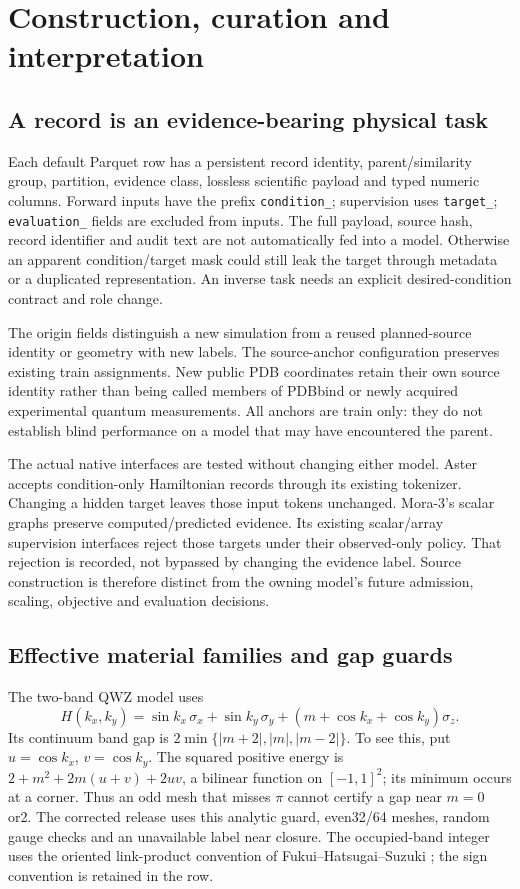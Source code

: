 \section{Construction, curation and interpretation}
\subsection{A record is an evidence-bearing physical task}
Each default Parquet row has a persistent record identity, parent/similarity
group, partition, evidence class, lossless scientific payload and typed numeric
columns. Forward inputs have the prefix \texttt{condition\_}; supervision uses
\texttt{target\_}; \texttt{evaluation\_} fields are excluded from inputs.
The full payload, source hash, record identifier and audit text are not
automatically fed into a model. Otherwise an apparent condition/target mask
could still leak the target through metadata or a duplicated representation.
An inverse task needs an explicit desired-condition contract and role change.

The origin fields distinguish a new simulation from a reused planned-source
identity or geometry with new labels. The source-anchor configuration preserves
existing train assignments. New public PDB coordinates retain their own source
identity rather than being called members of PDBbind or newly acquired
experimental quantum measurements. All anchors are train only: they do not
establish blind performance on a model that may have encountered the parent.

The actual native interfaces are tested without changing either model.
Aster accepts condition-only Hamiltonian records through its existing tokenizer.
Changing a hidden target leaves those input tokens unchanged. Mora-3's scalar
graphs preserve computed/predicted evidence. Its existing scalar/array
supervision interfaces reject those targets under their observed-only policy.
That rejection is recorded, not bypassed by changing the evidence label.
Source construction is therefore distinct from the owning model's future
admission, scaling, objective and evaluation decisions.

\subsection{Effective material families and gap guards}
The two-band QWZ model uses
\[
 H(k_x,k_y)=\sin k_x\,\sigma_x+\sin k_y\,\sigma_y
 +(m+\cos k_x+\cos k_y)\sigma_z.
\]
Its continuum band gap is
$2\min\{|m+2|,|m|,|m-2|\}$. To see this, put
$u=\cos k_x$, $v=\cos k_y$. The squared positive energy is
$2+m^2+2m(u+v)+2uv$, a bilinear function on $[-1,1]^2$;
its minimum occurs at a corner. Thus an odd mesh that misses $\pi$ cannot
certify a gap near $m=0$ or2. The corrected release uses this analytic guard,
even32/64 meshes, random gauge checks and an unavailable label near closure.
The occupied-band integer uses the oriented link-product convention of
Fukui--Hatsugai--Suzuki \cite{DSFHS}; the sign convention is retained in the row.

